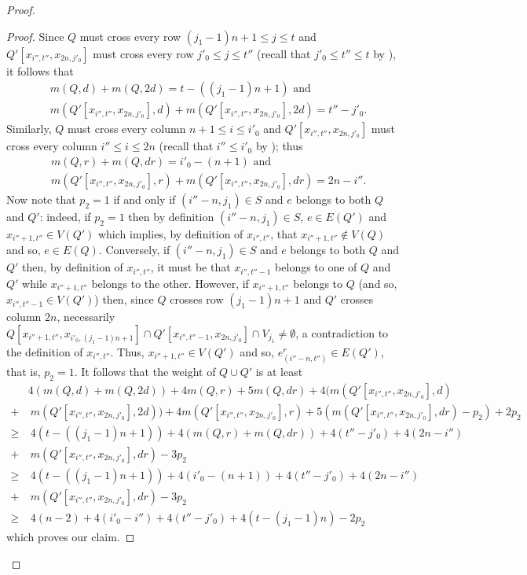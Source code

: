 \documentclass[a4paper,11pt]{article}
\theoremstyle{plain}
\newtheorem{identification rule}{Identification Rule}
\theoremstyle{definition}
\theoremstyle{remark}
\newenvironment{claimproof}{\begin{proof}\renewcommand{\qedsymbol}{\claimqed}}{\end{proof}\renewcommand{\qedsymbol}{\plainqed}}
\let\plainqed\qedsymbol
\newcommand{\claimqed}{$\lrcorner$}
\begin{document}
\begin{proof}
\begin{claimproof}
Since $Q$ must cross every row $(j_1-1)n+1 \leq j \leq t$ and $Q'[x_{i'',t''},x_{2n,j'_0}]$ must cross every row $j'_0 \leq j \leq t''$ (recall that $j'_0 \leq t'' \leq t$ by ), it follows that
\begin{equation*}
\begin{split}
& m(Q,d) + m(Q,2d) = t-((j_1-1)n+1) \text{ and}\\
& m(Q'[x_{i'',t''},x_{2n,j'_0}],d) + m(Q'[x_{i'',t''},x_{2n,j'_0}],2d) = t'' - j'_0.
\end{split}
\end{equation*} 
Similarly, $Q$ must cross every column $n+1 \leq i \leq i'_0$ and $Q'[x_{i'',t''},x_{2n,j'_0}]$ must cross every column $i'' \leq i \leq 2n$ (recall that $i'' \leq i'_0$ by ); thus
\begin{equation*}
\begin{split}
& m(Q,r) + m(Q,dr) = i'_0 - (n+1) \text{ and}\\
& m(Q'[x_{i'',t''},x_{2n,j'_0}],r) + m(Q'[x_{i'',t''},x_{2n,j'_0}],dr) = 2n-i''.
\end{split}
\end{equation*}
Now note that $p_2 =1$ if and only if $(i''-n,j_1) \in S$ and $e$ belongs to both $Q$ and $Q'$: indeed, if $p_2=1$ then by definition $(i''-n,j_1) \in S$, $e \in E(Q')$ and $x_{i''+1,t''} \in V(Q')$ which implies, by definition of $x_{i'',t''}$, that $x_{i''+1,t''} \notin V(Q)$ and so, $e \in E(Q)$. Conversely, if $(i''-n,j_1) \in S$ and $e$ belongs to both $Q$ and $Q'$ then, by definition of $x_{i'',t''}$, it must be that $x_{i'',t''-1}$ belongs to one of $Q$ and $Q'$ while $x_{i''+1,t''}$ belongs to the other. However, if $x_{i''+1,t''}$ belongs to $Q$ (and so, $x_{i'',t''-1} \in V(Q')$) then, since $Q$ crosses row $(j_1-1)n+1$ and $Q'$ crosses column $2n$, necessarily $Q[x_{i''+1,t''},x_{i'_0,(j_1-1)n+1}] \cap Q'[x_{i'',t''-1},x_{2n,j'_0}] \cap V_{j_1} \neq \emptyset$, a contradiction to the definition of $x_{i'',t''}$. Thus, $x_{i''+1,t''} \in V(Q')$ and so, $e^r_{(i''-n,t'')} \in E(Q')$, that is, $p_2=1$. It follows that the weight of $Q \cup Q'$ is at least
\begin{equation*}
\begin{split}
&  4(m(Q,d) + m(Q,2d)) + 4m(Q,r) + 5m(Q,dr) + 4(m(Q'[x_{i'',t''},x_{2n,j'_0}],d) \\ 
+&~m(Q'[x_{i'',t''},x_{2n,j'_0}],2d))+4m(Q'[x_{i'',t''},x_{2n,j'_0}],r) + 5(m(Q'[x_{i'',t''},x_{2n,j'_0}],dr) - p_2) + 2p_2\\
\geq &~4(t-((j_1-1)n+1)) + 4(m(Q,r) + m(Q,dr)) + 4(t''-j'_0) + 4(2n-i'')\\ 
+&~ m(Q'[x_{i'',t''},x_{2n,j'_0}],dr) - 3p_2\\
\geq &~4(t-((j_1-1)n+1)) + 4(i'_0-(n+1)) + 4(t'' - j'_0) + 4(2n - i'')\\
+&~m(Q'[x_{i'',t''},x_{2n,j'_0}],dr) - 3p_2\\
\geq & ~4(n-2) + 4(i'_0-i'') + 4(t''-j'_0) + 4(t-(j_1-1)n) - 2p_2
\end{split}
\end{equation*}
which proves our claim.
\end{claimproof}


\end{proof}
\end{document}
